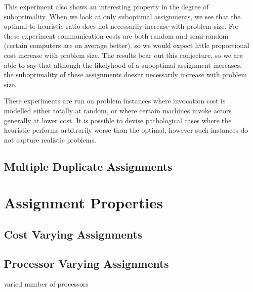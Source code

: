 This experiment also shows an interesting property in the degree of suboptimality.
When we look at only suboptimal assignments, we see that the optimal to heuristic ratio does not necessarily increase with problem size.
For these experiment communication costs are both random and semi-random (certain computers are on average better), so we would expect little proportional cost increase with problem size.
The results bear out this conjecture, so we are able to say that although the likelyhood of a suboptimal assignment increases, the suboptimality of these assignments doesnt necessarily increase with problem size.

These experiments are run on problem instances where invocation cost is modelled either totally at random, or where certain machines invoke actors generally at lower cost.
It is possible to devise pathological cases where the heuristic performs arbitrarily worse than the optimal, however such instances do not capture realistic problems.

\subsection{Multiple Duplicate Assignments}

\section{Assignment Properties}

\subsection{Cost Varying Assignments}

\subsection{Processor Varying Assignments}

varied number of processors
